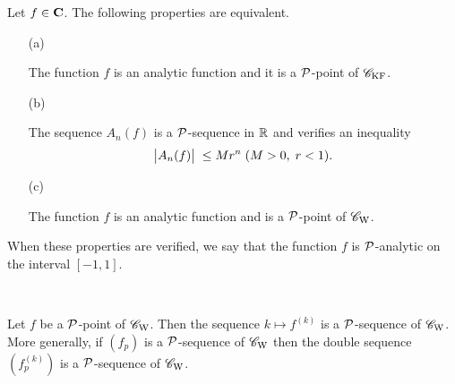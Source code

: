 \begin{theorem} \label{528}
Let $f \in {\bf C}$. The following properties are equivalent. 
\begin{itemize}

\item [(a)] 

The function $f$ is an analytic function and it is a ${\cal P}$-point of ${{{\mathscr C}}_{\rm KF}}$.

\item [(b)] 

The sequence $A_n(f)$ is a ${\cal P}$-sequence in $\mathbb {R}$ and verifies an inequality
\[
 \big|{A_n(f)}\big|\; \leq Mr^n \; (M > 0, \; r < 1).
\]

\item [(c)] 

The function $f$ is an analytic function and is a ${\cal P}$-point of ${{{\mathscr C}}_{\rm W}}$.
\end{itemize}
\end{theorem}

\begin{definition}\label{529} 

\noindent 
When these properties are verified, we say that the function $f$ is ${\cal P}$-analytic on the interval $[-1,1]$.
\end{definition}

\begin{theorem} \label{5210} 
~

\noindent 
Let $f$ be a ${\cal P}$-point of ${{{\mathscr C}}_{\rm W}}$. Then the sequence $k \mapsto f^{(k)}$ is a ${\cal P}$-sequence of ${{{\mathscr C}}_{\rm W}}$. 
More generally, if $(f_p)$ is a ${\cal P}$-sequence of ${{{\mathscr C}}_{\rm W}}$ then the double sequence $(f_p^{(k)})$ is a ${\cal P}$-sequence of ${{{\mathscr C}}_{\rm W}}$.
\end{theorem}

